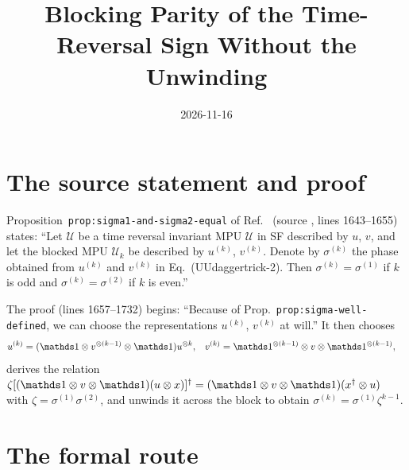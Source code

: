 \documentclass{article}
\title{Blocking Parity of the Time-Reversal Sign Without the Unwinding}
\author{}
\date{2026-11-16}
\begin{document}
\maketitle
{}

\section{The source statement and proof}

Proposition~\texttt{prop:sigma1-and-sigma2-equal} of Ref.~\cite{Cirac2017MPU}
(source , lines 1643--1655) states: ``Let
$\mathcal U$ be a time reversal invariant MPU $\mathcal U$ in SF described by
$u$, $v$, and let the blocked MPU $\mathcal U_k$ be described by $u^{(k)}$,
$v^{(k)}$. Denote by $\sigma^{(k)}$ the phase obtained from $u^{(k)}$ and
$v^{(k)}$ in Eq.~(UUdaggertrick-2). Then $\sigma^{(k)}=\sigma^{(1)}$ if $k$ is
odd and $\sigma^{(k)}=\sigma^{(2)}$ if $k$ is even.''

The proof (lines 1657--1732) begins: ``Because of
Prop.~\texttt{prop:sigma-well-defined}, we can choose the representations
$u^{(k)}$, $v^{(k)}$ at will.'' It then chooses
\begin{align}
    u^{(k)} & =(\Id\otimes v^{\otimes(k-1)}\otimes\Id)u^{\otimes k}, &
    v^{(k)} & =\Id^{\otimes(k-1)}\otimes v\otimes\Id^{\otimes(k-1)},
    \label{eq:mpu_time_reversal_blocking_parity_route_1}
\end{align}
derives the relation
$\zeta[(\Id\otimes v\otimes\Id)(u\otimes x)]^\dagger
    =(\Id\otimes v\otimes\Id)(x^\dagger\otimes u)$ with
$\zeta=\sigma^{(1)}\sigma^{(2)}$, and unwinds it across the block to obtain
$\sigma^{(k)}=\sigma^{(1)}\zeta^{k-1}$.

\section{The formal route}
\end{document}
